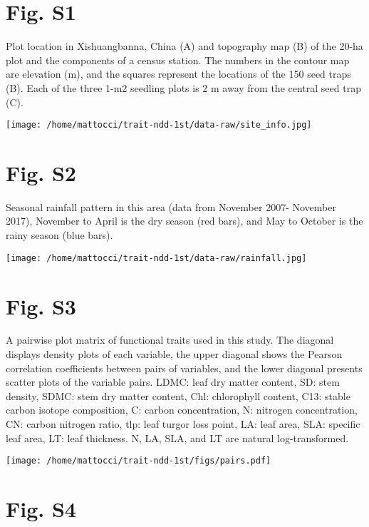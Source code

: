 \documentclass[
  12pt,
  letterpaper,
  DIV=11,
  numbers=noendperiod]{scrartcl}
\author{}
\date{}
\begin{document}
\hypertarget{fig.-s1}{%
\section{Fig. S1}\label{fig.-s1}}

Plot location in Xishuangbanna, China (A) and topography map (B) of the
20-ha plot and the components of a census station. The numbers in the
contour map are elevation (m), and the squares represent the locations
of the 150 seed traps (B). Each of the three 1-m2 seedling plots is 2 m
away from the central seed trap (C).

\texttt{[image: /home/mattocci/trait-ndd-1st/data-raw/site\_info.jpg]}

\newpage

\hypertarget{fig.-s2}{%
\section{Fig. S2}\label{fig.-s2}}

Seasonal rainfall pattern in this area (data from November 2007-
November 2017), November to April is the dry season (red bars), and May
to October is the rainy season (blue bars).

\texttt{[image: /home/mattocci/trait-ndd-1st/data-raw/rainfall.jpg]}

\newpage

\hypertarget{fig.-s3}{%
\section{Fig. S3}\label{fig.-s3}}

A pairwise plot matrix of functional traits used in this study. The
diagonal displays density plots of each variable, the upper diagonal
shows the Pearson correlation coefficients between pairs of variables,
and the lower diagonal presents scatter plots of the variable pairs.
LDMC: leaf dry matter content, SD: stem density, SDMC: stem dry matter
content, Chl: chlorophyll content, C13: stable carbon isotope
composition, C: carbon concentration, N: nitrogen concentration, CN:
carbon nitrogen ratio, tlp: leaf turgor loss point, LA: leaf area, SLA:
specific leaf area, LT: leaf thickness. N, LA, SLA, and LT are natural
log-transformed.

\texttt{[image: /home/mattocci/trait-ndd-1st/figs/pairs.pdf]}

\newpage

\hypertarget{fig.-s4}{%
\section{Fig. S4}\label{fig.-s4}}
\end{document}
